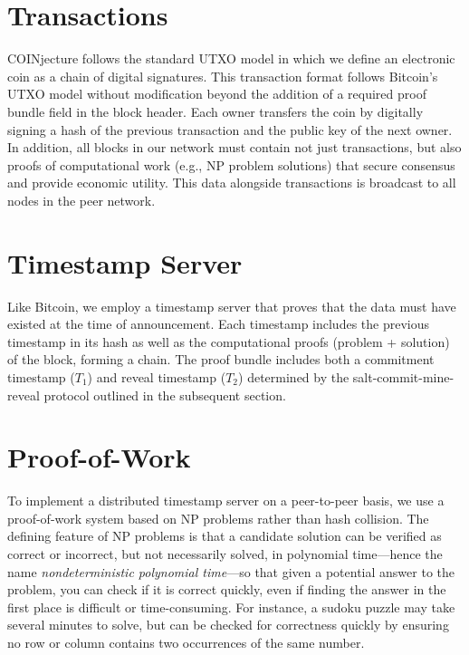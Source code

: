 \documentclass[12pt,letterpaper]{article}
\begin{document}
\section*{Transactions}

COINjecture follows the standard UTXO model in which we define an electronic coin as a chain of
digital signatures. This transaction format follows Bitcoin's UTXO model without modification beyond
the addition of a required proof bundle field in the block header. Each owner transfers the coin by
digitally signing a hash of the previous transaction and the public key of the next owner. In addition, all
blocks in our network must contain not just transactions, but also proofs of computational work (e.g., NP
problem solutions) that secure consensus and provide economic utility. This data alongside transactions is
broadcast to all nodes in the peer network.

\section*{Timestamp Server}

Like Bitcoin, we employ a timestamp server that proves that the data must have existed at the time of
announcement. Each timestamp includes the previous timestamp in its hash as well as the computational
proofs (problem + solution) of the block, forming a chain. The proof bundle includes both a commitment
timestamp ($T_1$) and reveal timestamp ($T_2$) determined by the salt-commit-mine-reveal protocol
outlined in the subsequent section.

\section*{Proof-of-Work}

To implement a distributed timestamp server on a peer-to-peer basis, we use a proof-of-work system
based on NP problems rather than hash collision. The defining feature of NP problems is that a candidate
solution can be verified as correct or incorrect, but not necessarily solved, in polynomial time---hence the
name \emph{nondeterministic polynomial time}---so that given a potential answer to the problem, you can
check if it is correct quickly, even if finding the answer in the first place is difficult or time-consuming.
For instance, a sudoku puzzle may take several minutes to solve, but can be checked for correctness
quickly by ensuring no row or column contains two occurrences of the same number.
\end{document}
